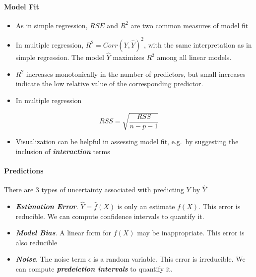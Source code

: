 \documentclass[11pt]{article}
\providecommand{\tightlist}{%
      \setlength{\itemsep}{0pt}\setlength{\parskip}{0pt}}
\begin{document}
    \hypertarget{model-fit}{%
\paragraph{Model Fit}\label{model-fit}}

    \begin{itemize}
\item
  As in simple regression, \(RSE\) and \(R^2\) are two common measures
  of model fit
\item
  In multiple regression, \(R^2 = Corr(Y, \hat{Y})^2\), with the same
  interpretation as in simple regression. The model \(\hat{Y}\)
  maximizes \(R^2\) among all linear models.
\item
  \(R^2\) increases monotonically in the number of predictors, but small
  increases indicate the low relative value of the corresponding
  predictor.
\item
  In multiple regression
\end{itemize}

\[ RSS = \sqrt{\frac{RSS}{n - p - 1}} \]

\begin{itemize}
\tightlist
\item
  Visualization can be helpful in assessing model fit, e.g.~by
  suggesting the inclusion of \textbf{\emph{interaction}} terms
\end{itemize}

    \hypertarget{predictions}{%
\paragraph{Predictions}\label{predictions}}

    There are 3 types of uncertainty associated with predicting \(Y\) by
\(\hat{Y}\)

\begin{itemize}
\item
  \textbf{\emph{Estimation Error}}. \(\hat{Y} = \hat{f}(X)\) is only an
  estimate \(f(X)\). This error is reducible. We can compute confidence
  intervals to quantify it.
\item
  \textbf{\emph{Model Bias}}. A linear form for \(f(X)\) may be
  inappropriate. This error is also reducible
\item
  \textbf{\emph{Noise}}. The noise term \(\epsilon\) is a random
  variable. This error is irreducible. We can compute
  \textbf{\emph{predeiction intervals}} to quantify it.
\end{itemize}
\end{document}
